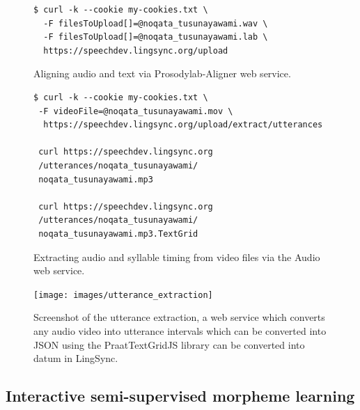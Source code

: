 \documentclass[11pt]{article}
\begin{document}
\begin{figure}[h]
\scriptsize
\begin{verbatim}
$ curl -k --cookie my-cookies.txt \
  -F filesToUpload[]=@noqata_tusunayawami.wav \
  -F filesToUpload[]=@noqata_tusunayawami.lab \
  https://speechdev.lingsync.org/upload

\end{verbatim}
\normalsize
\caption{Aligning audio and text via Prosodylab-Aligner web service.}
\label{lingsync-aligner}
\end{figure}



\begin{figure}[h]
\scriptsize
\begin{verbatim}
$ curl -k --cookie my-cookies.txt \
 -F videoFile=@noqata_tusunayawami.mov \
  https://speechdev.lingsync.org/upload/extract/utterances
  
 curl https://speechdev.lingsync.org
 /utterances/noqata_tusunayawami/
 noqata_tusunayawami.mp3 
 
 curl https://speechdev.lingsync.org
 /utterances/noqata_tusunayawami/
 noqata_tusunayawami.mp3.TextGrid
\end{verbatim}
\normalsize
\caption{Extracting audio and syllable timing from video files via the Audio web service.}
\label{lingsync-video}
\end{figure}



\begin{figure}
\begin{center}
\texttt{[image: images/utterance\_extraction]}
\caption{Screenshot of the utterance extraction, a web service which converts any audio video into utterance intervals which can be converted into JSON using the PraatTextGridJS library can be converted into datum in LingSync.}
\label{utterance_extraction_screenshot}
\end{center}
\end{figure}

\subsection{Interactive semi-supervised morpheme learning}
\end{document}
